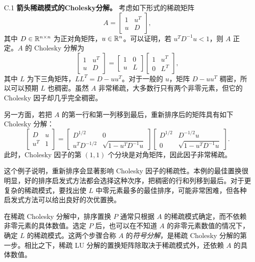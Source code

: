 \begin{origexample}{C.1}
\textbf{箭头稀疏模式的Cholesky分解。} 考虑如下形式的稀疏矩阵
\[
 A=\begin{bmatrix}1&u^T\\u&D\end{bmatrix},
\]
其中 $D\in\mathbb R^{n\times n}$ 为正对角矩阵，$u\in\mathbb R^n$。可以证明，若 $u^TD^{-1}u<1$，则 $A$ 正定。$A$ 的 Cholesky 分解为
\begin{equation}
 \begin{bmatrix}1&u^T\\u&D\end{bmatrix}
 =\begin{bmatrix}1&0\\u&L\end{bmatrix}
 \begin{bmatrix}1&u^T\\0&L^T\end{bmatrix},\tag{C.2}
\end{equation}
其中 $L$ 为下三角矩阵，$LL^T=D-uu^T$。对于一般的 $u$，矩阵 $D-uu^T$ 稠密，所以可以预期 $L$ 也稠密。虽然 $A$ 非常稀疏，大多数行只有两个非零元素，但它的 Cholesky 因子却几乎完全稠密。

另一方面，若把 $A$ 的第一行和第一列移到最后，重新排序后的矩阵具有如下 Cholesky 分解：
\[
 \begin{bmatrix}D&u\\u^T&1\end{bmatrix}
 =\begin{bmatrix}D^{1/2}&0\\u^TD^{-1/2}&\sqrt{1-u^TD^{-1}u}\end{bmatrix}
 \begin{bmatrix}D^{1/2}&D^{-1/2}u\\0&\sqrt{1-u^TD^{-1}u}\end{bmatrix}.
\]
此时，Cholesky 因子的第 $(1,1)$ 个分块是对角矩阵，因此因子非常稀疏。

这个例子说明，重新排序会显著影响 Cholesky 因子的稀疏性。本例的最佳置换很明显，好的排序启发式方法都会选择这种次序，把稠密的行和列移到最后。对于更复杂的稀疏模式，要找出使 $L$ 中零元素最多的最佳排序，可能非常困难，但各种启发式方法可以给出良好的次优置换。
\end{origexample}

在稀疏 Cholesky 分解中，排序置换 $P$ 通常只根据 $A$ 的稀疏模式确定，而不依赖非零元素的具体数值。选定 $P$ 后，也可以在不知道 $A$ 的非零元素数值的情况下，确定 $L$ 的稀疏模式。这两个步骤合称 $A$ 的\emph{符号分解}，是稀疏 Cholesky 分解的第一步。相比之下，稀疏 LU 分解的置换矩阵除取决于稀疏模式外，还依赖 $A$ 的具体数值。

